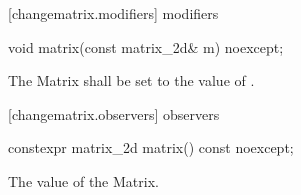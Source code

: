 [changematrix.modifiers]{ modifiers}

\begin{itemdecl}
void matrix(const matrix_2d& m) noexcept;
\end{itemdecl}
\begin{itemdescr}
\pnum
\effects
The Matrix shall be set to the value of .
\end{itemdescr}

 [changematrix.observers]{ observers}

\begin{itemdecl}
constexpr matrix_2d matrix() const noexcept;
\end{itemdecl}
\begin{itemdescr}
\pnum
\returns
The value of the Matrix.
\end{itemdescr}
